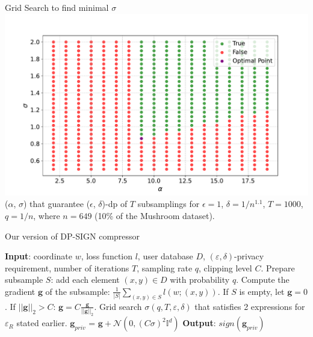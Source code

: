 \documentclass{beamer}
\newcommand{\eps}{\varepsilon}
\begin{document}
\begin{frame}{Grid Search to find minimal $\sigma$}
\includegraphics[width=1.0\textwidth]{grid_sigma_to_pres.pdf}
($\alpha$, $\sigma$) that guarantee ($\epsilon$, $\delta$)-dp of $T$ subsamplings for $\epsilon = 1$, $\delta = 1/n^{1.1}$, $T = 1000$, $q = 1/n$, where $n=649$ (10\% of the Mushroom dataset).

\end{frame}
\begin{frame}{Our version of DP-SIGN compressor}
\newcommand{\gradg}{\boldsymbol{g}}
    \begin{algorithmic}
        \STATE \textbf{Input}: coordinate $w$, loss function $l$, user database $D$, $(\eps, \delta)$-privacy requirement, number of iterations $T$, sampling rate $q$, clipping level $C$.
        \STATE Prepare subsample $S$: add each element $(x, y) \in D$ with probability $q$.
        \STATE Compute the gradient $\gradg$ of the subsample: $\frac{1}{|S|}\sum_{(x,y)\in S}l(w;(x,y))$. If $S$ is empty, let $\gradg = 0$.
        \STATE If $||\gradg||_2 > C$: $\gradg = C\frac{\gradg}{||\gradg||_2}$.
        \STATE Grid search $\sigma(q, T, \eps, \delta)$ that satisfies 2 expressions for $\eps_R$ stated earlier.
        \STATE $\gradg_{priv}$ = $\gradg + \mathcal{N}(0,(C\sigma)^2\mathbb{I}^d)$
        \STATE \textbf{Output}: $sign(\gradg_{priv})$
    \end{algorithmic}
\end{frame}
\end{document}
